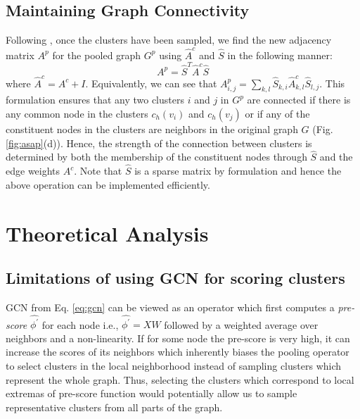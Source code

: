 \documentclass[letterpaper]{article} \usepackage{aaai20}  \usepackage{times}  \usepackage{helvet} \usepackage{courier}  \usepackage[hyphens]{url}  \usepackage{graphicx} \urlstyle{rm} \def\UrlFont{\rm}  \usepackage{graphicx}  \frenchspacing  \setlength{\pdfpagewidth}{8.5in}  \setlength{\pdfpageheight}{11in}
\begin{document}
\subsection{Maintaining Graph Connectivity}
\label{ssec:graph-connectivity}
Following \cite{diffpool}, once the clusters have been sampled, we find the new adjacency matrix $A^{p}$ for the pooled graph $G^p$ using $\hat{A}^c$ and $\hat{S}$ in the following manner:
\begin{equation}
\label{eq:stas}
    A^{p} = \hat{S}^{T} \hat{A}^c \hat{S}
\end{equation}
where $\hat{A}^c = A^c + I$. Equivalently, we can see that $A^{p}_{i,j} = \sum_{k,l} \hat{S}_{k,i} \hat{A}^c_{k,l} \hat{S}_{l,j}$. This formulation ensures that any two clusters $i$ and $j$ in $G^{p}$ are connected if there is any common node in the clusters $c_{h}(v_{i})$ and $c_{h}(v_{j})$ or if any of the constituent nodes in the clusters are neighbors in the original graph $G$ (Fig. \ref{fig:asap}(d)). Hence, the strength of the connection between clusters is determined by both the membership of the constituent nodes through $\hat{S}$ and the edge weights $A^c$. Note that $\hat{S}$ is a sparse matrix by formulation and hence the above operation can be implemented efficiently.



 
\section{Theoretical Analysis}
\subsection{Limitations of using GCN for scoring clusters}

\label{ssec:leconv-use}
GCN from Eq. \eqref{eq:gcn} can be viewed as an operator which first computes a \textit{pre-score} $\hat{\phi^{\prime}}$ for each node i.e., $\hat{\phi^{\prime}} = XW$ followed by a weighted average over neighbors and a non-linearity. If for some node the pre-score is very high, it can increase the scores of its neighbors which inherently biases the pooling operator to select clusters in the local neighborhood instead of sampling clusters which represent the whole graph. Thus, selecting the clusters which correspond to local extremas of pre-score function would potentially allow us to sample representative clusters from all parts of the graph. 
\end{document}

